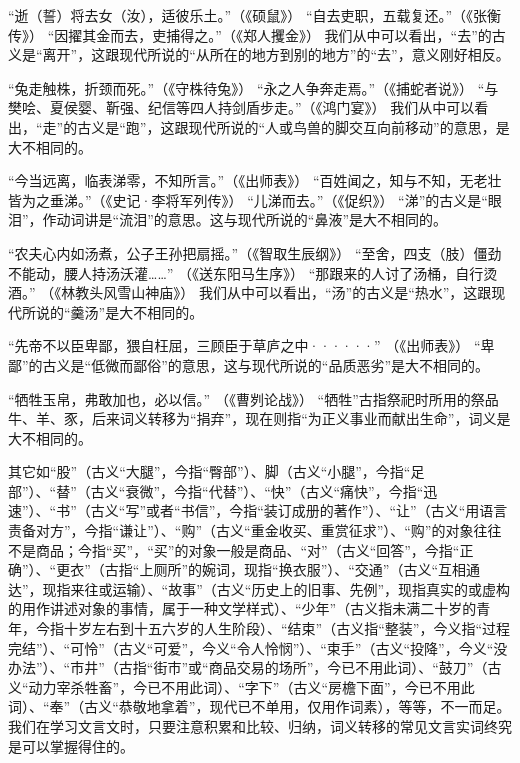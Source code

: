 \begin{entry}
\item[去：]“逝（誓）将去女（汝），适彼乐土。”（《硕鼠》）
“自去吏职，五载复还。”（《张衡传》） “因擢其金而去，吏捕得之。”（《郑人攫金》） 我们从中可以看出，“去”的古义是“离开”，这跟现代所说的“从所在的地方到别的地方”的“去”，意义刚好相反。

\item[走：]“兔走触株，折颈而死。”（《守株待兔》） “永之人争奔走焉。”（《捕蛇者说》） “与樊哙、夏侯婴、靳强、纪信等四人持剑盾步走。”（《鸿门宴》） 我们从中可以看出，“走”的古义是“跑”，这跟现代所说的“人或鸟兽的脚交互向前移动”的意思，是大不相同的。

\item[涕：]“今当远离，临表涕零，不知所言。”（《出师表》） “百姓闻之，知与不知，无老壮皆为之垂涕。”（《史记·李将军列传》） “儿涕而去。”（《促织》） “涕”的古义是“眼泪”，作动词讲是“流泪”的意思。这与现代所说的“鼻液”是大不相同的。

\item[汤：]“农夫心内如汤煮，公子王孙把扇摇。”（《智取生辰纲》） “至舍，四支（肢）僵劲不能动，腰人持汤沃灌……” （《送东阳马生序》） “那跟来的人讨了汤桶，自行烫酒。” （《林教头风雪山神庙》） 我们从中可以看出，“汤”的古义是“热水”，这跟现代所说的“羹汤”是大不相同的。

\item[卑鄙：]“先帝不以臣卑鄙，猥自枉屈，三顾臣于草庐之中······” （《出师表》） “卑鄙”的古义是“低微而鄙俗”的意思，这与现代所说的“品质恶劣”是大不相同的。

\item[牺牲：]“牺牲玉帛，弗敢加也，必以信。” （《曹刿论战》） “牺牲”古指祭祀时所用的祭品牛、羊、豕，后来词义转移为“捐弃”，现在则指“为正义事业而献出生命”，词义是大不相同的。
\end{entry}

其它如“股”（古义“大腿”，今指“臀部”）、脚（古义“小腿”，今指“足部”）、“替”（古义“衰微”，今指“代替”）、“快”（古义“痛快”，今指“迅速”）、“书”（古义“写”或者“书信”，今指“装订成册的著作”）、“让”（古义“用语言责备对方”，今指“谦让”）、“购”（古义“重金收买、重赏征求”）、“购”的对象往往不是商品；今指“买”，“买”的对象一般是商品、“对”（古义“回答”，今指“正确”）、“更衣”（古指“上厕所”的婉词，现指“换衣服”）、“交通”（古义“互相通达”，现指来往或运输）、“故事”（古义“历史上的旧事、先例”，现指真实的或虚构的用作讲述对象的事情，属于一种文学样式）、“少年”（古义指未满二十岁的青年，今指十岁左右到十五六岁的人生阶段）、“结束”（古义指“整装”，今义指“过程完结”）、“可怜”（古义“可爱”，今义“令人怜悯”）、“束手”（古义“投降”，今义“没办法”）、“市井”（古指“街市”或“商品交易的场所”，今已不用此词）、“鼓刀”（古义“动力宰杀牲畜”，今已不用此词）、“字下”（古义“房檐下面”，今已不用此词）、“奉”（古义“恭敬地拿着”，现代已不单用，仅用作词素），等等，不一而足。我们在学习文言文时，只要注意积累和比较、归纳，词义转移的常见文言实词终究是可以掌握得住的。
\newpage